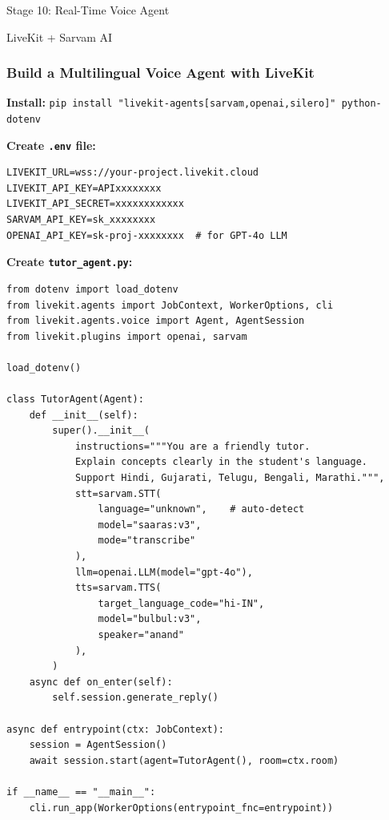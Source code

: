 \begin{frame}[fragile]\frametitle{}
\begin{center}
{\Large Stage 10: Real-Time Voice Agent}

{\normalsize LiveKit + Sarvam AI}
\end{center}
\end{frame}

\begin{frame}[fragile]\frametitle{Build a Multilingual Voice Agent with LiveKit}
\textbf{Install:} \lstinline|pip install "livekit-agents[sarvam,openai,silero]" python-dotenv|

\textbf{Create \texttt{.env} file:}
\begin{lstlisting}
LIVEKIT_URL=wss://your-project.livekit.cloud
LIVEKIT_API_KEY=APIxxxxxxxx
LIVEKIT_API_SECRET=xxxxxxxxxxxx
SARVAM_API_KEY=sk_xxxxxxxx
OPENAI_API_KEY=sk-proj-xxxxxxxx  # for GPT-4o LLM
\end{lstlisting}

\textbf{Create \texttt{tutor\_agent.py}:}
\begin{lstlisting}
from dotenv import load_dotenv
from livekit.agents import JobContext, WorkerOptions, cli
from livekit.agents.voice import Agent, AgentSession
from livekit.plugins import openai, sarvam

load_dotenv()

class TutorAgent(Agent):
    def __init__(self):
        super().__init__(
            instructions="""You are a friendly tutor.
            Explain concepts clearly in the student's language.
            Support Hindi, Gujarati, Telugu, Bengali, Marathi.""",
            stt=sarvam.STT(
                language="unknown",    # auto-detect
                model="saaras:v3",
                mode="transcribe"
            ),
            llm=openai.LLM(model="gpt-4o"),
            tts=sarvam.TTS(
                target_language_code="hi-IN",
                model="bulbul:v3",
                speaker="anand"
            ),
        )
    async def on_enter(self):
        self.session.generate_reply()

async def entrypoint(ctx: JobContext):
    session = AgentSession()
    await session.start(agent=TutorAgent(), room=ctx.room)

if __name__ == "__main__":
    cli.run_app(WorkerOptions(entrypoint_fnc=entrypoint))
\end{lstlisting}
\end{frame}

